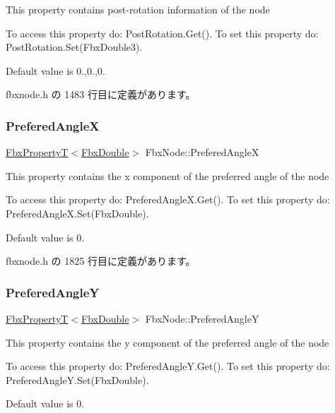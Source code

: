 This property contains post-\/rotation information of the node

To access this property do\+: Post\+Rotation.\+Get(). To set this property do\+: Post\+Rotation.\+Set(\+Fbx\+Double3).

Default value is 0.,0.,0. 

 fbxnode.\+h の 1483 行目に定義があります。

\mbox{\label{class_fbx_node_a1d8741e42e815896c90d9305d34419f9}} 
\subsubsection{\texorpdfstring{Prefered\+AngleX}{PreferedAngleX}}
{\footnotesize\ttfamily \hyperlink{class_fbx_property_t}{Fbx\+PropertyT}$<$\hyperlink{fbxtypes_8h_a171e72a1c46fc15c1a6c9c31948c1c5b}{Fbx\+Double}$>$ Fbx\+Node\+::\+Prefered\+AngleX}

This property contains the x component of the preferred angle of the node

To access this property do\+: Prefered\+Angle\+X.\+Get(). To set this property do\+: Prefered\+Angle\+X.\+Set(\+Fbx\+Double).

Default value is 0. 

 fbxnode.\+h の 1825 行目に定義があります。

\mbox{\label{class_fbx_node_ac5f0da599ec317865ff798392aa3d6a6}} 
\subsubsection{\texorpdfstring{Prefered\+AngleY}{PreferedAngleY}}
{\footnotesize\ttfamily \hyperlink{class_fbx_property_t}{Fbx\+PropertyT}$<$\hyperlink{fbxtypes_8h_a171e72a1c46fc15c1a6c9c31948c1c5b}{Fbx\+Double}$>$ Fbx\+Node\+::\+Prefered\+AngleY}

This property contains the y component of the preferred angle of the node

To access this property do\+: Prefered\+Angle\+Y.\+Get(). To set this property do\+: Prefered\+Angle\+Y.\+Set(\+Fbx\+Double).

Default value is 0. 

